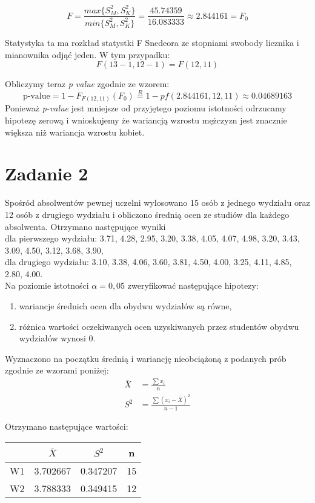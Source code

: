\documentclass{article}
\begin{document}
\[ F = \frac{max\{S_M^2, S_K^2\}}{min\{S_M^2, S_K^2\}} = \frac{45.74359}{16.083333} \approx 2.844161 = F_0 \]

Statystyka ta ma rozkład statystki F Snedeora ze stopniami swobody licznika i mianownika odjąć jeden. W tym przypadku:
\[ F(13-1, 12-1) = F(12,11) \]

Obliczymy teraz \textit{p value} zgodnie ze wzorem:
\[ \text{p-value} = 1 - F_{F(12,11)}(F_0) \overset{R}{=} 1 - pf(2.844161, 12, 11) \approx 0.04689163 \]
Ponieważ \textit{p-value} jest mniejsze od przyjętego poziomu istotności odrzucamy hipotezę zerową i wnioskujemy że wariancją wzrostu mężczyzn jest znacznie większa niż wariancja wzrostu kobiet.

\newpage
\section{Zadanie 2}
Spośród absolwentów pewnej uczelni wylosowano 15 osób z jednego wydziału oraz 12 osób z drugiego wydziału i obliczono średnią ocen ze studiów dla każdego absolwenta. Otrzymano następujące wyniki \\
dla pierwszego wydziału: 3.71, 4.28, 2.95, 3.20, 3.38, 4.05, 4.07, 4.98, 3.20, 3.43, 3.09, 4.50, 3.12, 3.68, 3.90, \\
dla drugiego wydziału: 3.10, 3.38, 4.06, 3.60, 3.81, 4.50, 4.00, 3.25, 4.11, 4.85, 2.80, 4.00. \\
Na poziomie istotności $\alpha=0,05$ zweryfikować następujące hipotezy:
\begin{enumerate}[label = \alph*)]
\item wariancje średnich ocen dla obydwu wydziałów są równe,
\item różnica wartości oczekiwanych ocen uzyskiwanych przez studentów obydwu wydziałów wynosi 0.
\end{enumerate}

Wyznaczono na początku średnią i wariancję nieobciążoną z podanych prób zgodnie ze wzorami poniżej:
\begin{align*}
\overline{X} & = \frac{\sum x_i}{n} \\
S^2 &= \frac{\sum (x_i - \overline{X})^2 }{n-1}
\end{align*}

Otrzymano następujące wartości:
\begin{center} \begin{tabular}{|c|c|c|c|} \hline
 & $\overline{X}$ & $S^2$ & n \\ \hline
W1 & 3.702667 & 0.347207 & 15\\ \hline
W2 & 3.788333 & 0.349415 & 12\\ \hline
\end{tabular} \end{center}
\end{document}

